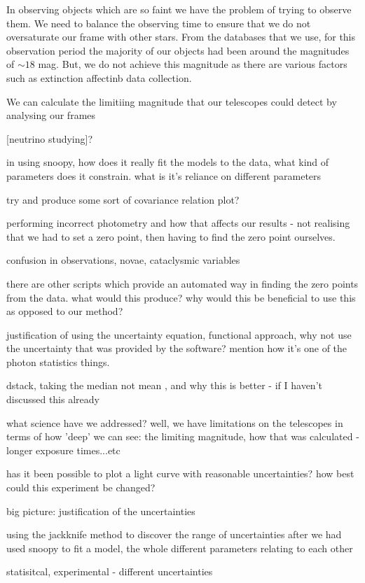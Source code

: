 \documentclass[twocolumn]{revtex4}
\begin{document}
In observing objects which are so faint we have the problem of trying to observe them. We need to balance the observing time to ensure that we do not oversaturate our frame with other stars. From the databases that we use, for this observation period the majority of our objects had been around the magnitudes of $\sim 18$ mag. But, we do not achieve this magnitude as there are various factors such as extinction affectinb data collection. 

We can calculate the limitiing magnitude that our telescopes could detect by analysing our frames

[neutrino studying]?



in using snoopy, how does it really fit the models to the data, what kind of parameters does it constrain. what is it's reliance on different parameters

try and produce some sort of covariance relation plot?

performing incorrect photometry and how that affects our results - not realising that we had to set a zero point, then having to find the zero point ourselves. 

confusion in observations, novae, cataclysmic variables 

there are other scripts which provide an automated way in finding the zero points from the data. what would this produce? why would this be beneficial to use this as opposed to our method?

justification of using the uncertainty equation, functional approach, why not use the uncertainty that was provided by the software? mention how it's one of the photon statistics things.

dstack, taking the median not mean , and why this is better - if I haven't discussed this already

what science have we addressed? well, we have limitations on the telescopes in terms of how 'deep' we can see:  the limiting magnitude, how that was calculated - longer exposure times...etc

has it been possible to plot a light curve with reasonable uncertainties? how best could this experiment be changed? 

big picture: justification of the uncertainties 

using the jackknife method to discover the range of uncertainties after we had used snoopy to fit a model, the whole different parameters relating to each other

statisitcal, experimental - different uncertainties
\end{document}
